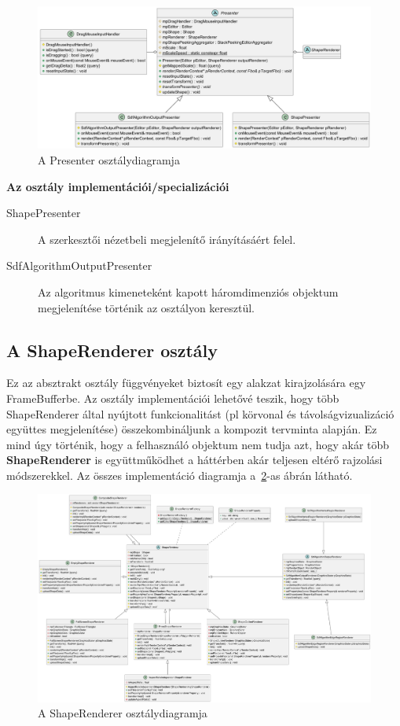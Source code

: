 \begin{figure}[H]
	\centering
	\includegraphics[width=1\linewidth]{images/class_presenter.png}
	\caption{A Presenter osztálydiagramja}
	\label{fig:class_presenter-1}
\end{figure}

\textbf{Az osztály implementációi/specializációi}

\begin{description}
	\item[ShapePresenter] A szerkesztői nézetbeli megjelenítő irányításáért felel.
	\item[SdfAlgorithmOutputPresenter] Az algoritmus kimeneteként kapott háromdimenziós objektum megjelenítése történik az osztályon keresztül.
\end{description}

\subsection{A ShapeRenderer osztály}

Ez az absztrakt osztály függvényeket biztosít egy alakzat kirajzolására egy FrameBufferbe. Az osztály implementációi lehetővé teszik, hogy több ShapeRenderer által nyújtott funkcionalitást (pl körvonal és távolságvizualizáció együttes megjelenítése) összekombináljunk a kompozit tervminta alapján. Ez mind úgy történik, hogy a felhasználó objektum nem tudja azt, hogy akár több \textbf{ShapeRenderer} is együttműködhet a háttérben akár teljesen eltérő rajzolási módszerekkel. Az összes implementáció diagramja a~\ref{fig:class_shape_renderer-1}-as ábrán látható.

\begin{figure}[H]
	\centering
	\includegraphics[width=1\linewidth]{images/class_shape_renderer.png}
	\caption{A ShapeRenderer osztálydiagramja}
	\label{fig:class_shape_renderer-1}
\end{figure}

